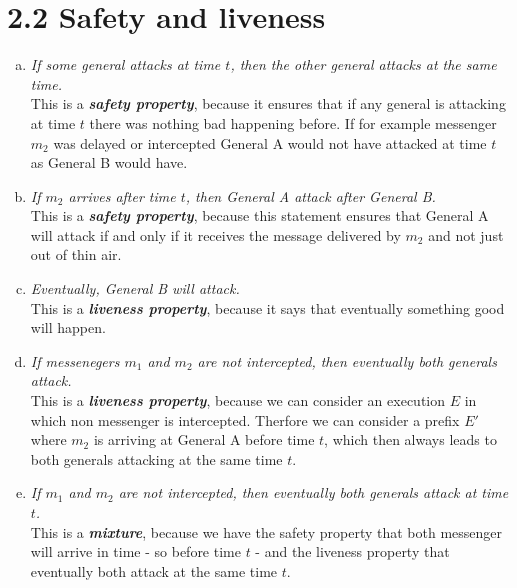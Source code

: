\documentclass{article}
\begin{document}
	\section*{2.2 Safety and liveness}
	\begin{adjustwidth}{2em}{2em}	
		\begin{enumerate}[(a)]
			\item \textit{If some general attacks at time $t$, then the other general attacks at the same time.} \\
			This is a \textit{\textbf{safety property}}, because it ensures that if any general is attacking at time $t$ there was nothing bad happening before. If for example messenger $m_2$ was delayed or intercepted General A would not have attacked at time $t$ as General B would have.
			\item \textit{If $m_2$ arrives after time $t$, then General A attack after General B.} \\
			This is a \textit{\textbf{safety property}}, because this statement ensures that General A will attack if and only if it receives the message delivered by $m_2$ and not just out of thin air.
			\item \textit{Eventually, General B will attack.} \\
			This is a \textit{\textbf{liveness property}}, because it says that eventually something good will happen.
			\item \textit{If messenegers $m_1$ and $m_2$ are not intercepted, then eventually both generals attack.} \\
			This is a \textit{\textbf{liveness property}}, because we can consider an execution $E$ in which non messenger is intercepted. Therfore we can consider a prefix $E'$ where $m_2$ is arriving at General A before time $t$, which then always leads to both generals attacking at the same time $t$.
			\item \textit{If $m_1$ and $m_2$ are not intercepted, then eventually both generals attack at time $t$.} \\
			This is a \textit{\textbf{mixture}}, because we have the safety property that both messenger will arrive in time - so before time $t$ - and the liveness property that eventually both attack at the same time $t$.
		\end{enumerate}			
	\end{adjustwidth}
	
\end{document}
